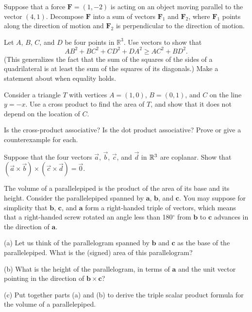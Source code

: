 \documentclass{watsonbook}
\begin{document}
\begin{aexercise}
Suppose that a force $\mathbf{F}=(1,-2)$ is acting on an object moving
parallel to the vector $(4,1)$. Decompose $\mathbf{F}$ into a sum of
vectors $\mathbf{F}_1$ and $\mathbf{F}_2$, where $\mathbf{F}_1$ points
along the direction of motion and $\mathbf{F}_2$ is perpendicular to
the direction of motion.
\end{aexercise}

\begin{aexercise}%
  Let $A$, $B$, $C$, and $D$ be four points in $\mathbb{R}^3$. Use vectors to show that 
\[
AB^2 +BC^2 + CD^2 + DA^2 \geq AC^2 + BD^2. 
\]
(This generalizes the fact that the sum of the squares of the sides of
a quadrilateral is at least the sum of the squares of its diagonals.)
Make a statement about when equality holds.
\end{aexercise}


\begin{aexercise}
  Consider a triangle $T$ with vertices $A=(1,0)$, $B=(0,1)$, and $C$ on the line $y=-x$. Use a cross product to find the area of $T$, and show that it does not depend on the location of $C$. 
\end{aexercise}

\begin{aexercise}
  Is the cross-product associative? Is the dot product associative?
  Prove or give a counterexample for each.
\end{aexercise}

\begin{aexercise}
  Suppose that the four vectors $\vec{a}$, $\vec{b}$, $\vec{c}$, and
  $\vec{d}$ in $\mathbb{R}^3$ are coplanar. Show that \\
  $(\vec{a}\times\vec{b})\times(\vec{c}\times\vec{d})=\vec{0}$.
\end{aexercise}

\begin{aexercise}
  The volume of a parallelepiped is the product of the area of its
  base and its height. Consider the parallelepiped spanned by
  $\mathbf{a}$, $\mathbf{b}$, and $\mathbf{c}$. You may suppose for
  simplicity that $\mathbf{b}$, $\mathbf{c}$, and $\mathbf{a}$ form a
  right-handed triple of vectors, which means that a right-handed
  screw rotated an angle less than 180$^\circ$ from $\mathbf{b}$ to
  $\mathbf{c}$ advances in the direction of $\mathbf{a}$.

  (a) Let us think of the parallelogram spanned by $\mathbf{b}$ and
  $\mathbf{c}$ as the base of the parallelepiped. What is the (signed)
  area of this parallelogram?

  (b) What is the height of the parallelogram, in terms of
  $\mathbf{a}$ and the unit vector pointing in the direction of
  $\mathbf{b} \times\mathbf{c}$?

  (c) Put together parts (a) and (b) to derive the triple scalar
  product formula for the volume of a parallelepiped.
\end{aexercise}
\end{document}
